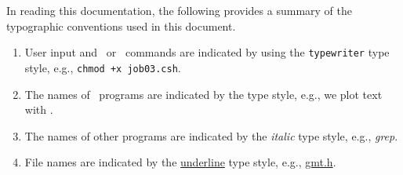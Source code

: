 In reading this documentation, the following provides a summary of
the typographic conventions used in this document.

\begin{enumerate}

\item User input and \GMT\ or \UNIX\ commands are indicated by
using the \texttt{typewriter} type style, e.g., \texttt{chmod +x job03.csh}.

\item The names of \GMT\ programs are indicated by the
 type style, e.g., we plot text with .

\item The names of other programs are indicated by the
{\textit{italic} type style, e.g., \textit{grep}.}

\item File names are indicated by the \underline{underline}
type style, e.g., \underline{gmt.h}.

\end{enumerate}
